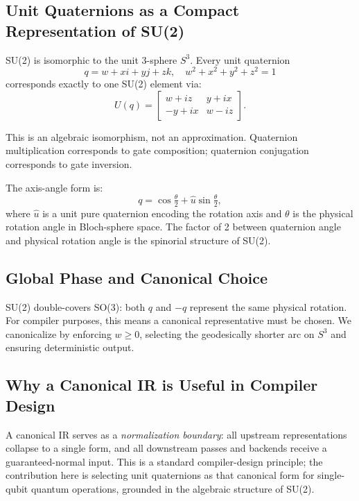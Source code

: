 \documentclass[conference]{IEEEtran}
\begin{document}
\subsection{Unit Quaternions as a Compact Representation of SU(2)}

SU(2) is isomorphic to the unit 3-sphere $S^3$. Every unit quaternion
\begin{equation}
q = w + xi + yj + zk, \quad w^2 + x^2 + y^2 + z^2 = 1
\label{eq:quat}
\end{equation}
corresponds exactly to one SU(2) element via:
\begin{equation}
U(q) =
\begin{bmatrix}
 w + iz  &  y + ix \\
-y + ix  &  w - iz
\end{bmatrix}.
\label{eq:su2matrix}
\end{equation}

This is an algebraic isomorphism, not an approximation. Quaternion multiplication corresponds
to gate composition; quaternion conjugation corresponds to gate inversion.

The axis-angle form is:
\begin{equation}
q = \cos\!\tfrac{\theta}{2} + \hat{u}\sin\!\tfrac{\theta}{2},
\label{eq:axisangle}
\end{equation}
where $\hat{u}$ is a unit pure quaternion encoding the rotation axis and $\theta$ is the
physical rotation angle in Bloch-sphere space. The factor of 2 between quaternion angle and
physical rotation angle is the spinorial structure of SU(2).

\subsection{Global Phase and Canonical Choice}

SU(2) double-covers SO(3): both $q$ and $-q$ represent the same physical rotation. For
compiler purposes, this means a canonical representative must be chosen. We canonicalize by
enforcing $w \geq 0$, selecting the geodesically shorter arc on $S^3$ and ensuring
deterministic output.

\subsection{Why a Canonical IR is Useful in Compiler Design}

A canonical IR serves as a \textit{normalization boundary}: all upstream representations
collapse to a single form, and all downstream passes and backends receive a
guaranteed-normal input. This is a standard compiler-design principle; the contribution here
is selecting unit quaternions as that canonical form for single-qubit quantum operations,
grounded in the algebraic structure of SU(2).
\end{document}
